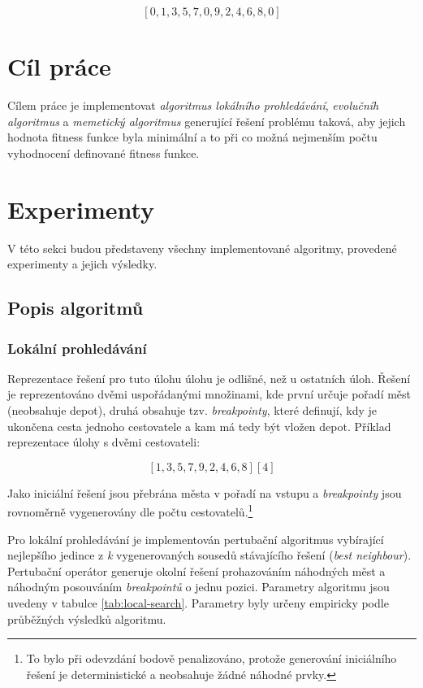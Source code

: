\documentclass[journal]{IEEEtrancz}
\begin{document}
$$[0,1,3,5,7,0,9,2,4,6,8,0]$$ 

\section{Cíl práce}
Cílem práce je implementovat \textit{algoritmus lokálního prohledávání}, \textit{evolučníh algoritmus} a \textit{memetický algoritmus} generující řešení problému taková, aby jejich hodnota fitness funkce byla minimální a to při co možná nejmenším počtu vyhodnocení definované fitness funkce. 

\section{Experimenty}
V této sekci budou představeny všechny implementované algoritmy, provedené experimenty a jejich výsledky. 

\subsection{Popis algoritmů}
\bigskip
\subsubsection{Lokální prohledávání}
\label{sec:local-search}
Reprezentace řešení pro tuto úlohu úlohu je odlišné, než u ostatních úloh. Řešení je reprezentováno dvěmi uspořádanými množinami, kde první určuje pořadí měst (neobsahuje depot), druhá obsahuje tzv. \textit{breakpointy}, které definují, kdy je ukončena cesta jednoho cestovatele a kam má tedy být vložen depot. Příklad reprezentace úlohy s dvěmi cestovateli:

$$[1,3,5,7,9,2,4,6,8][4]$$

Jako iniciální řešení jsou přebrána města v pořadí na vstupu a \textit{breakpointy} jsou rovnoměrně vygenerovány dle počtu cestovatelů.\footnote{To bylo při odevzdání bodově penalizováno, protože generování iniciálního řešení je deterministické a neobsahuje žádné náhodné prvky.}

Pro lokální prohledávání je implementován pertubační algoritmus vybírající nejlepšího jedince z \textit{k} vygenerovaných sousedů stávajícího řešení (\textit{best neighbour}). Pertubační operátor generuje okolní řešení prohazováním náhodných měst a náhodným posouváním \textit{breakpointů} o jednu pozici. Parametry algoritmu jsou uvedeny v tabulce \ref{tab:local-search}. Parametry byly určeny empiricky podle průběžných výsledků algoritmu.
\end{document}
